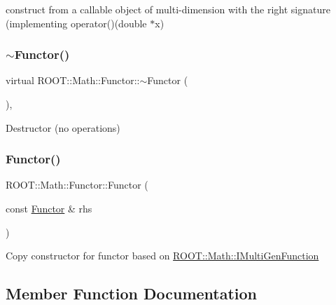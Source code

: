 construct from a callable object of multi-\/dimension with the right signature (implementing operator()(double $\ast$x) \mbox{\label{classROOT_1_1Math_1_1Functor_a349935f827a453deb17fdad728849028}} 
\subsubsection{\texorpdfstring{$\sim$Functor()}{~Functor()}\hspace{0.1cm}{\footnotesize\ttfamily [3/3]}}
{\footnotesize\ttfamily virtual R\+O\+O\+T\+::\+Math\+::\+Functor\+::$\sim$\+Functor (\begin{DoxyParamCaption}{ }\end{DoxyParamCaption})\hspace{0.3cm}{\ttfamily [inline]}, {\ttfamily [virtual]}}

Destructor (no operations) \mbox{\label{classROOT_1_1Math_1_1Functor_a001bfe27e95032f05685167e77e0efbd}} 
\subsubsection{\texorpdfstring{Functor()}{Functor()}\hspace{0.1cm}{\footnotesize\ttfamily [12/12]}}
{\footnotesize\ttfamily R\+O\+O\+T\+::\+Math\+::\+Functor\+::\+Functor (\begin{DoxyParamCaption}\item[{const \mbox{\hyperlink{classROOT_1_1Math_1_1Functor}{Functor}} \&}]{rhs }\end{DoxyParamCaption})\hspace{0.3cm}{\ttfamily [inline]}}

Copy constructor for functor based on \mbox{\hyperlink{namespaceROOT_1_1Math_aec22897f3d759f7c284893c81d980799}{R\+O\+O\+T\+::\+Math\+::\+I\+Multi\+Gen\+Function}} 

\subsection{Member Function Documentation}
\mbox{\label{classROOT_1_1Math_1_1Functor_a989f9b6dd160ebe03911cdee00dacaad}} 
